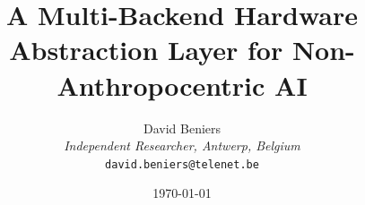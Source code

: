 \documentclass[11pt]{article}
\title{\huge \textbf{A Multi-Backend Hardware Abstraction Layer for Non-Anthropocentric AI} }
\author{
    David Beniers \\
    \small \textit{Independent Researcher, Antwerp, Belgium} \\
    \small \texttt{david.beniers@telenet.be}
}
\date{\today}
\begin{document}
\maketitle


\tableofcontents
\newpage


\FloatBarrier

\FloatBarrier

\FloatBarrier

\FloatBarrier

\FloatBarrier

\FloatBarrier

\FloatBarrier

\FloatBarrier

\FloatBarrier

\FloatBarrier

\FloatBarrier

\FloatBarrier

\appendix


\printbibliography
\end{document}
